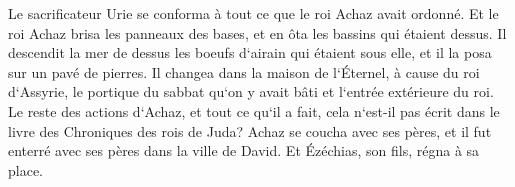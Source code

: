 \verse Le sacrificateur Urie se conforma à tout ce que le roi Achaz avait ordonné. 
\verse Et le roi Achaz brisa les panneaux des bases, et en ôta les bassins qui étaient dessus. Il descendit la mer de dessus les boeufs d`airain qui étaient sous elle, et il la posa sur un pavé de pierres. 
\verse Il changea dans la maison de l`Éternel, à cause du roi d`Assyrie, le portique du sabbat qu`on y avait bâti et l`entrée extérieure du roi. 
\verse Le reste des actions d`Achaz, et tout ce qu`il a fait, cela n`est-il pas écrit dans le livre des Chroniques des rois de Juda? 
\verse Achaz se coucha avec ses pères, et il fut enterré avec ses pères dans la ville de David. Et Ézéchias, son fils, régna à sa place. 

\chapter{}

